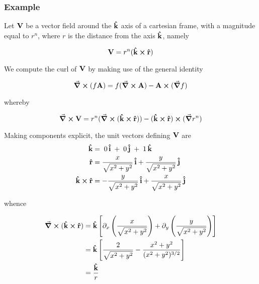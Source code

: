 \subsubsection*{Example}
Let $\vb{V}$ be a vector field  around the $\vu{k}$ axis of a cartesian frame, with a magnitude equal to $r^n$, where $r$ is the distance from the axis $\vu{k}$, namely

\begin{equation}
\vb{V} = r^n (\vu{k} \cross \vu{r})
\label{eq:curl_example_field}
\end{equation}  

We compute the curl of $\vb{V}$ by making use of the general identity

\begin{equation}
\curl{(f \vb{A})} = f (\curl{\vb{A}}) - \vb{A} \cross (\grad{f})
\label{eq:product_curl}
\end{equation} 

whereby 

\begin{equation}
\curl{\vb{V}} = r^n (\curl{(\vu{k} \cross \vu{r})}) - (\vu{k} \cross \vu{r}) \cross (\grad{r^n})
\label{eq:rotV}
\end{equation}

Making components explicit, the unit vectors defining $\vb{V}$ are     
\begin{align*}
\vu{k} &= \;0\, \vu{i}\; + \;0\, \vu{j}\; + \;1\, \vu{k}		\\ 
\vu{r} &= \frac{x }{\sqrt{x^2 + y^2}}\, \vu{i} + \frac{y}{\sqrt{x^2 + y^2}}\, \vu{j} \\
\vu{k} \cross \vu{r} &= -\frac{y}{\sqrt{x^2 + y^2}}\, \vu{i} + \frac{x}{\sqrt{x^2 + y^2}}\, \vu{j}
\end{align*} 

whence 

\begin{equation}
\begin{aligned}
\curl{(\vu{k} \cross \vu{r})} &= \vu{k} \left[ \partial_x \left( \frac{x}{\sqrt{x^2 + y^2}} \right) 
                                            +  \partial_y \left( \frac{y}{\sqrt{x^2 + y^2}} \right) \right] \\
                              &= \vu{k} \left[ \frac{2}{\sqrt{x^2 + y^2}} - \frac{x^2 + y^2}{(x^2 + y^2)^{3/2}} \right] \\
                              &= \frac{\vu{k}}{r}
\end{aligned} 
\end{equation}

